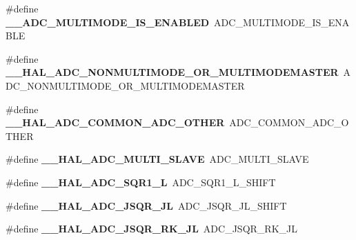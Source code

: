 \begin{DoxyCompactItemize}
\#define {\bfseries \+\_\+\+\_\+\+A\+D\+C\+\_\+\+M\+U\+L\+T\+I\+M\+O\+D\+E\+\_\+\+I\+S\+\_\+\+E\+N\+A\+B\+L\+ED}~A\+D\+C\+\_\+\+M\+U\+L\+T\+I\+M\+O\+D\+E\+\_\+\+I\+S\+\_\+\+E\+N\+A\+B\+LE
\item 
\mbox{\label{group___h_a_l___a_d_c___aliased___macros_ga3dceabcf80e81b5a911bbe5ad3ff311a}} 
\#define {\bfseries \+\_\+\+\_\+\+H\+A\+L\+\_\+\+A\+D\+C\+\_\+\+N\+O\+N\+M\+U\+L\+T\+I\+M\+O\+D\+E\+\_\+\+O\+R\+\_\+\+M\+U\+L\+T\+I\+M\+O\+D\+E\+M\+A\+S\+T\+ER}~A\+D\+C\+\_\+\+N\+O\+N\+M\+U\+L\+T\+I\+M\+O\+D\+E\+\_\+\+O\+R\+\_\+\+M\+U\+L\+T\+I\+M\+O\+D\+E\+M\+A\+S\+T\+ER
\item 
\mbox{\label{group___h_a_l___a_d_c___aliased___macros_gafa9bcc01aa0b2a887721e8971031ad0b}} 
\#define {\bfseries \+\_\+\+\_\+\+H\+A\+L\+\_\+\+A\+D\+C\+\_\+\+C\+O\+M\+M\+O\+N\+\_\+\+A\+D\+C\+\_\+\+O\+T\+H\+ER}~A\+D\+C\+\_\+\+C\+O\+M\+M\+O\+N\+\_\+\+A\+D\+C\+\_\+\+O\+T\+H\+ER
\item 
\mbox{\label{group___h_a_l___a_d_c___aliased___macros_gaeff1a570027a91c87a339fd79704c3d2}} 
\#define {\bfseries \+\_\+\+\_\+\+H\+A\+L\+\_\+\+A\+D\+C\+\_\+\+M\+U\+L\+T\+I\+\_\+\+S\+L\+A\+VE}~A\+D\+C\+\_\+\+M\+U\+L\+T\+I\+\_\+\+S\+L\+A\+VE
\item 
\mbox{\label{group___h_a_l___a_d_c___aliased___macros_ga27072f37b7d50adad434a681331755f0}} 
\#define {\bfseries \+\_\+\+\_\+\+H\+A\+L\+\_\+\+A\+D\+C\+\_\+\+S\+Q\+R1\+\_\+L}~A\+D\+C\+\_\+\+S\+Q\+R1\+\_\+\+L\+\_\+\+S\+H\+I\+FT
\item 
\mbox{\label{group___h_a_l___a_d_c___aliased___macros_ga8764a28e2bb7d6a859fc52074e2ec1ec}} 
\#define {\bfseries \+\_\+\+\_\+\+H\+A\+L\+\_\+\+A\+D\+C\+\_\+\+J\+S\+Q\+R\+\_\+\+JL}~A\+D\+C\+\_\+\+J\+S\+Q\+R\+\_\+\+J\+L\+\_\+\+S\+H\+I\+FT
\item 
\mbox{\label{group___h_a_l___a_d_c___aliased___macros_ga51b8c1d68c48edfa958f988845d2ea41}} 
\#define {\bfseries \+\_\+\+\_\+\+H\+A\+L\+\_\+\+A\+D\+C\+\_\+\+J\+S\+Q\+R\+\_\+\+R\+K\+\_\+\+JL}~A\+D\+C\+\_\+\+J\+S\+Q\+R\+\_\+\+R\+K\+\_\+\+JL
\item 

\end{DoxyCompactItemize}
